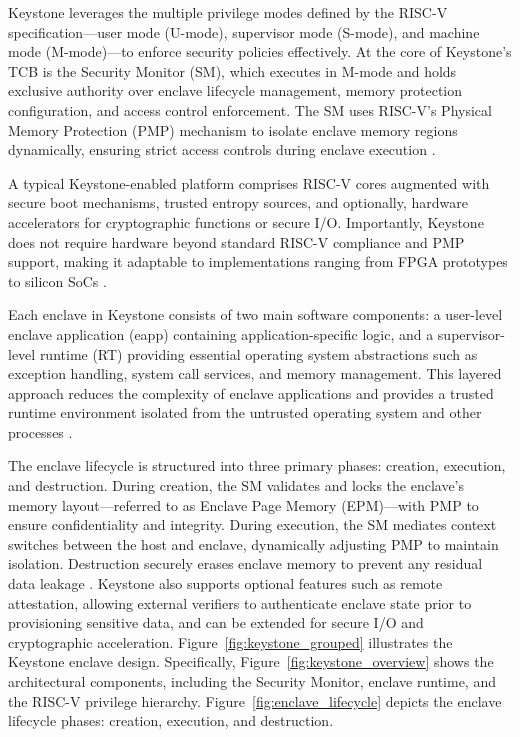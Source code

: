 Keystone leverages the multiple privilege modes defined by the RISC-V specification—user mode (U-mode), supervisor mode (S-mode), and machine mode (M-mode)—to enforce security policies effectively. At the core of Keystone’s TCB is the Security Monitor (SM), which executes in M-mode and holds exclusive authority over enclave lifecycle management, memory protection configuration, and access control enforcement. The SM uses RISC-V’s Physical Memory Protection (PMP) mechanism to isolate enclave memory regions dynamically, ensuring strict access controls during enclave execution \cite{Lee2019}.

A typical Keystone-enabled platform comprises RISC-V cores augmented with secure boot mechanisms, trusted entropy sources, and optionally, hardware accelerators for cryptographic functions or secure I/O. Importantly, Keystone does not require hardware beyond standard RISC-V compliance and PMP support, making it adaptable to implementations ranging from FPGA prototypes to silicon SoCs \cite{Lee2019}.

Each enclave in Keystone consists of two main software components: a user-level enclave application (eapp) containing application-specific logic, and a supervisor-level runtime (RT) providing essential operating system abstractions such as exception handling, system call services, and memory management. This layered approach reduces the complexity of enclave applications and provides a trusted runtime environment isolated from the untrusted operating system and other processes \cite{Lee2019}.

The enclave lifecycle is structured into three primary phases: creation, execution, and destruction. During creation, the SM validates and locks the enclave’s memory layout—referred to as Enclave Page Memory (EPM)—with PMP to ensure confidentiality and integrity. During execution, the SM mediates context switches between the host and enclave, dynamically adjusting PMP to maintain isolation. Destruction securely erases enclave memory to prevent any residual data leakage \cite{Lee2019}. Keystone also supports optional features such as remote attestation, allowing external verifiers to authenticate enclave state prior to provisioning sensitive data, and can be extended for secure I/O and cryptographic acceleration.
Figure~\ref{fig:keystone_grouped} illustrates the Keystone enclave design. Specifically, Figure~\ref{fig:keystone_overview} shows the architectural components, including the Security Monitor, enclave runtime, and the RISC-V privilege hierarchy. Figure~\ref{fig:enclave_lifecycle} depicts the enclave lifecycle phases: creation, execution, and destruction.

